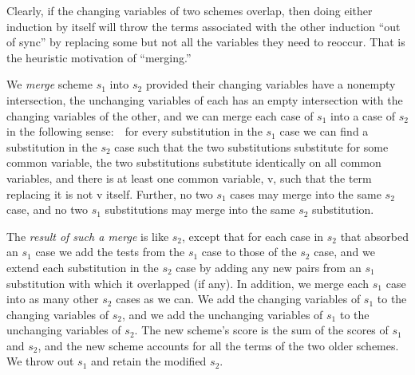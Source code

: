 \documentclass[11pt]{book}
\newcommand{\pubinlineunderline}[1]{\emph{#1}}
\begin{document}
Clearly, if the changing variables of two
schemes overlap, then doing either induction by itself will throw the
terms associated with the other induction ``out of sync'' by replacing some
but not all the variables they need to reoccur.
That is the heuristic motivation of ``merging.''

We \pubinlineunderline{merge} scheme $s_{1}$ into $s_{2}$ provided their changing variables have a nonempty intersection,
the unchanging variables of each has an empty intersection with the changing variables of
the other, and we can merge each case of $s_{1}$ into a case of $s_{2}$
in the following sense:~~for every substitution in the $s_{1}$ case we can
find a substitution in the $s_{2}$ case such that the two substitutions
substitute for some common variable, the two substitutions substitute
identically on all common variables, and there is at least one common
variable, v, such that the term replacing it is not v itself.
Further, no two $s_{1}$ cases may merge
into the same $s_{2}$ case, and no two $s_{1}$ substitutions may merge
into the same $s_{2}$ substitution.

The \pubinlineunderline{result of such a merge} is like $s_{2}$, except that for each case
in $s_{2}$ that absorbed an $s_{1}$ case we add the tests from the $s_{1}$ case
to those of the $s_{2}$ case, and we extend each substitution in the $s_{2}$
case by adding  any new pairs from an $s_{1}$ substitution with which it overlapped (if any).
In addition, we merge each $s_{1}$ case into as many other $s_{2}$ cases
as we can.  We add the changing variables of $s_{1}$ to the changing variables of
$s_{2}$, and we add the unchanging variables of $s_{1}$ to the unchanging variables of
$s_{2}$.  The new scheme's score is
the sum of the scores of $s_{1}$ and $s_{2}$, and the new scheme
accounts for all the terms of the two older schemes.  We throw out $s_{1}$ and
retain the modified $s_{2}$.
\end{document}
